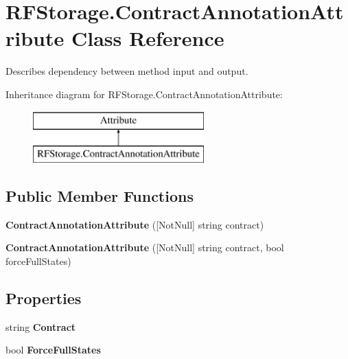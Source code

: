 \section{R\+F\+Storage.\+Contract\+Annotation\+Attribute Class Reference}
\label{class_r_f_storage_1_1_contract_annotation_attribute}


Describes dependency between method input and output.  


Inheritance diagram for R\+F\+Storage.\+Contract\+Annotation\+Attribute\+:\begin{figure}[H]
\begin{center}
\leavevmode
\includegraphics[height=2.000000cm]{class_r_f_storage_1_1_contract_annotation_attribute}
\end{center}
\end{figure}
\subsection*{Public Member Functions}
\begin{DoxyCompactItemize}
\item 
\mbox{\label{class_r_f_storage_1_1_contract_annotation_attribute_a725a00696a616223084ad436b7a37034}} 
{\bfseries Contract\+Annotation\+Attribute} ([Not\+Null] string contract)
\item 
\mbox{\label{class_r_f_storage_1_1_contract_annotation_attribute_aeae026f00acf5d8e7df36e9ce182c23b}} 
{\bfseries Contract\+Annotation\+Attribute} ([Not\+Null] string contract, bool force\+Full\+States)
\end{DoxyCompactItemize}
\subsection*{Properties}
\begin{DoxyCompactItemize}
\item 
\mbox{\label{class_r_f_storage_1_1_contract_annotation_attribute_a8a8954367bcc8bda30130790513a5ac3}} 
string {\bfseries Contract}\hspace{0.3cm}{\ttfamily  [get]}
\item 
\mbox{\label{class_r_f_storage_1_1_contract_annotation_attribute_a978e413c4ab52eb74be30fe454083d6f}} 
bool {\bfseries Force\+Full\+States}\hspace{0.3cm}{\ttfamily  [get]}
\end{DoxyCompactItemize}



